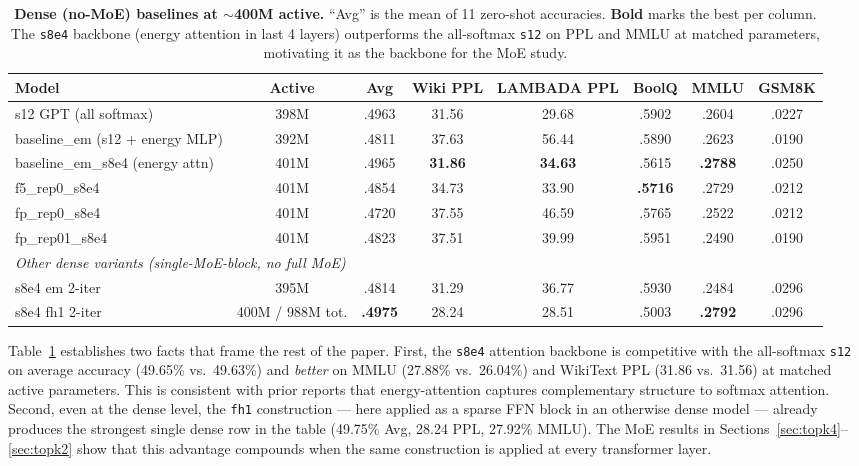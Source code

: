 \documentclass[oneside]{article}
\begin{document}
\begin{table}[t]
\centering
\caption{\textbf{Dense (no-MoE) baselines at $\sim$400M active.} ``Avg'' is the mean of 11 zero-shot accuracies. \textbf{Bold} marks the best per column. The \texttt{s8e4} backbone (energy attention in last 4 layers) outperforms the all-softmax \texttt{s12} on PPL and MMLU at matched parameters, motivating it as the backbone for the MoE study.}
\label{tab:dense}
\begin{adjustbox}{max width=\textwidth}
\begin{tabular}{l|c|ccc|c|cc}
\toprule
\textbf{Model} & \textbf{Active} & \textbf{Avg} & \textbf{Wiki PPL} & \textbf{LAMBADA PPL} & \textbf{BoolQ} & \textbf{MMLU} & \textbf{GSM8K} \\
\midrule
s12 GPT (all softmax)         & 398M & .4963 & 31.56 & 29.68 & .5902 & .2604 & .0227 \\
baseline\_em (s12 + energy MLP) & 392M & .4811 & 37.63 & 56.44 & .5890 & .2623 & .0190 \\
\midrule
baseline\_em\_s8e4 (energy attn) & 401M & .4965 & \textbf{31.86} & \textbf{34.63} & .5615 & \textbf{.2788} & .0250 \\
f5\_rep0\_s8e4                & 401M & .4854 & 34.73 & 33.90 & \textbf{.5716} & .2729 & .0212 \\
fp\_rep0\_s8e4                & 401M & .4720 & 37.55 & 46.59 & .5765 & .2522 & .0212 \\
fp\_rep01\_s8e4               & 401M & .4823 & 37.51 & 39.99 & .5951 & .2490 & .0190 \\
\midrule
\multicolumn{8}{l}{\textit{Other dense variants (single-MoE-block, no full MoE)}} \\
s8e4 em 2-iter                & 395M & .4814 & 31.29 & 36.77 & .5930 & .2484 & .0296 \\
s8e4 fh1 2-iter               & 400M / 988M tot. & \textbf{.4975} & 28.24 & 28.51 & .5003 & \textbf{.2792} & .0296 \\
\bottomrule
\end{tabular}
\end{adjustbox}
\end{table}

Table~\ref{tab:dense} establishes two facts that frame the rest of the paper. First, the \texttt{s8e4} attention backbone is competitive with the all-softmax \texttt{s12} on average accuracy (49.65\% vs.\ 49.63\%) and \emph{better} on MMLU (27.88\% vs.\ 26.04\%) and WikiText PPL (31.86 vs.\ 31.56) at matched active parameters. This is consistent with prior reports that energy-attention captures complementary structure to softmax attention. Second, even at the dense level, the \texttt{fh1} construction --- here applied as a sparse FFN block in an otherwise dense model --- already produces the strongest single dense row in the table (49.75\% Avg, 28.24 PPL, 27.92\% MMLU). The MoE results in Sections~\ref{sec:topk4}--\ref{sec:topk2} show that this advantage compounds when the same construction is applied at every transformer layer.
\end{document}
